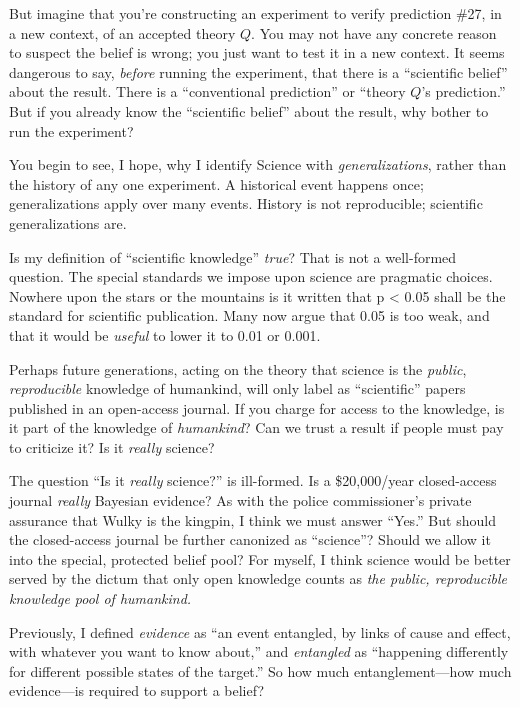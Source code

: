 {
 But imagine that you're constructing an experiment
to verify prediction \#27, in a new context, of an accepted theory $Q$.
You may not have any concrete reason to suspect the belief is wrong;
you just want to test it in a new context. It seems dangerous to say,
\textit{before} running the experiment, that there is a
``scientific belief'' about the
result. There is a ``conventional
prediction'' or ``theory
$Q$'s prediction.'' But if you already
know the ``scientific belief'' about
the result, why bother to run the experiment?}

{
 You begin to see, I hope, why I identify Science with
\textit{generalizations}, rather than the history of any one
experiment. A historical event happens once; generalizations apply over
many events. History is not reproducible; scientific generalizations
are.}

{
 Is my definition of ``scientific
knowledge'' \textit{true}? That is not a well-formed
question. The special standards we impose upon science are pragmatic
choices. Nowhere upon the stars or the mountains is it written that p
{\textless} 0.05 shall be the standard for scientific publication. Many
now argue that 0.05 is too weak, and that it would be \textit{useful}
to lower it to 0.01 or 0.001.}

{
 Perhaps future generations, acting on the theory that science is
the \textit{public}, \textit{reproducible} knowledge of humankind, will
only label as ``scientific'' papers
published in an open-access journal. If you charge for access to the
knowledge, is it part of the knowledge of \textit{humankind}? Can we
trust a result if people must pay to criticize it? Is it
\textit{really} science?}

{
 The question ``Is it \textit{really}
science?'' is ill-formed. Is a \$20,000/year
closed-access journal \textit{really} Bayesian evidence? As with the
police commissioner's private assurance that Wulky is
the kingpin, I think we must answer
``Yes.'' But should the
closed-access journal be further canonized as
``science''? Should we allow it into
the special, protected belief pool? For myself, I think science would
be better served by the dictum that only open knowledge counts as
\textit{the public, reproducible knowledge pool of humankind.}}

\myendsectiontext




{
 Previously, I defined \textit{evidence} as ``an
event entangled, by links of cause and effect, with whatever you want
to know about,'' and \textit{entangled} as
``happening differently for different possible states
of the target.'' So how much entanglement---how much
evidence---is required to support a belief? }

